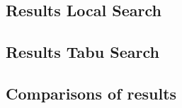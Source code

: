 \subsection{Results Local Search}

\subsection{Results Tabu Search}


\subsection{Comparisons of results}